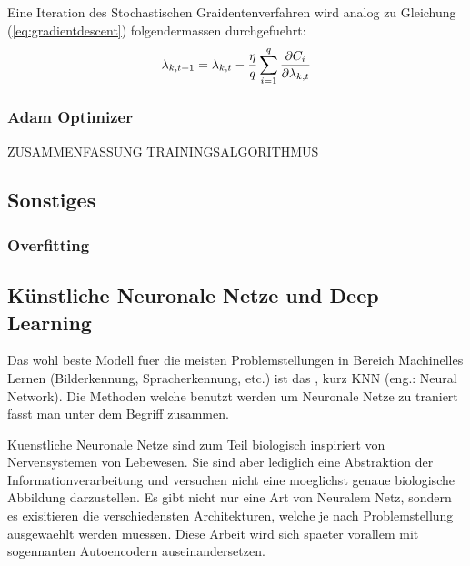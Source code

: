 \documentclass[../main]{subfiles}
\begin{document}
Eine Iteration des Stochastischen Graidentenverfahren wird analog zu Gleichung (\ref{eq:gradientdescent}) folgendermassen durchgefuehrt:
\begin{equation}\label{eq:sgd}
  \lambda_{k,t+1} = \lambda_{k,t} - \frac{\eta}{q} \sum_{i=1}^{q} \frac{\partial C_i}{\partial \lambda_{k,t}}
\end{equation}


\subsubsection{Adam Optimizer}
ZUSAMMENFASSUNG TRAININGSALGORITHMUS

\subsection{Sonstiges}

\subsubsection{Overfitting}

\pagebreak
\subsection{Künstliche Neuronale Netze und Deep Learning}
Das wohl beste Modell fuer die meisten Problemstellungen in Bereich Machinelles Lernen (Bilderkennung, Spracherkennung, etc.) ist das , kurz KNN (eng.: Neural Network).
Die Methoden welche benutzt werden um Neuronale Netze zu traniert fasst man unter dem Begriff  zusammen.

Kuenstliche Neuronale Netze sind zum Teil biologisch inspiriert von Nervensystemen von Lebewesen. Sie sind aber lediglich eine Abstraktion der Informationverarbeitung und versuchen nicht eine moeglichst genaue biologische Abbildung darzustellen.
Es gibt nicht nur eine Art von Neuralem Netz, sondern es exisitieren die
verschiedensten Architekturen, welche je nach Problemstellung ausgewaehlt werden
muessen. Diese Arbeit wird sich spaeter vorallem mit sogennanten Autoencodern auseinandersetzen.
\end{document}
